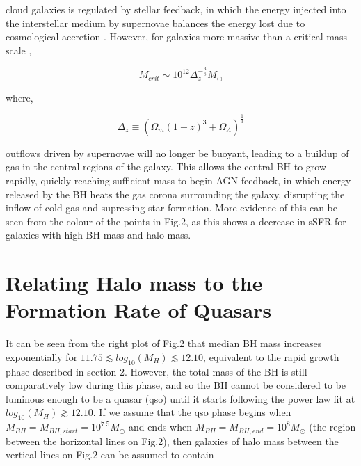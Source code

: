\documentclass[12pt, twocolumn]{revtex4}    %
\begin{document}
\noindent cloud galaxies is regulated by  stellar feedback, in which the energy injected into the interstellar medium by supernovae balances the energy lost due to cosmological accretion \cite{Ikea}. However, for galaxies more massive than a critical mass scale \cite{Quasar},

\begin{equation}
    M_{crit}\sim10^{12}\Delta_{z}^{-\frac{3}{8}}M_\odot
\end{equation}

\noindent where,

\begin{equation}
    \Delta_z\equiv(\Omega_m(1+z)^3+\Omega_\Lambda)^{\frac{1}{3}}
\end{equation}

\noindent outflows driven by supernovae will no longer be buoyant, leading to a buildup of gas in the central regions of the galaxy. This allows the central BH to grow rapidly, quickly reaching sufficient mass to begin AGN feedback, in which energy released by the BH heats the gas corona surrounding the galaxy, disrupting the inflow of cold gas and supressing star formation. More evidence of this can be seen from the colour of the points in Fig.2, as this shows a decrease in sSFR for galaxies with high BH mass and halo mass.

\section{Relating Halo mass to the Formation Rate of Quasars}

It can be seen from the right plot of Fig.2 that median BH mass increases exponentially for $11.75 \lesssim log_{10}(M_H) \lesssim 12.10$, equivalent to the rapid growth phase described in section 2. However, the total mass of the BH is still comparatively low during this phase, and so the BH cannot be considered to be luminous enough to be a quasar (qso) until it starts following the power law fit at $log_{10}(M_H) \gtrsim 12.10$. If we assume that the qso phase begins when $M_{BH}=M_{BH,start}=10^{7.5}M_\odot$ and ends when $M_{BH}=M_{BH,end}=10^8M_\odot$ (the region between the horizontal lines on Fig.2), then galaxies of halo mass between the vertical lines on Fig.2 can be assumed to contain

\onecolumngrid
\end{document}
